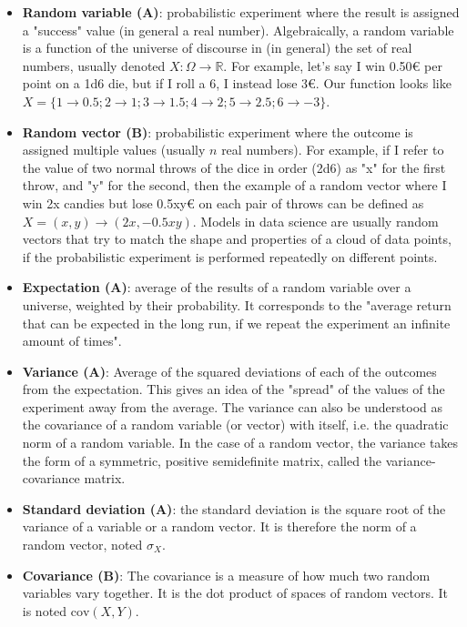\documentclass{article}
\begin{document}
\begin{itemize}
    \item \textbf{Random variable (A)}: probabilistic experiment where the result is assigned a "success" value (in general a real number). Algebraically, a random variable is a function of the universe of discourse in (in general) the set of real numbers, usually denoted $X : \Omega \rightarrow \mathbb{R}$. For example, let's say I win 0.50€ per point on a 1d6 die, but if I roll a 6, I instead lose 3€. Our function looks like $X = \{ 1 \rightarrow 0.5 ; 2 \rightarrow 1 ; 3 \rightarrow 1.5 ; 4 \rightarrow 2 ; 5 \rightarrow 2.5 ; 6 \rightarrow -3 \}$.
    
    \item \textbf{Random vector (B)}: probabilistic experiment where the outcome is assigned multiple values (usually $n$ real numbers). For example, if I refer to the value of two normal throws of the dice in order (2d6) as "x" for the first throw, and "y" for the second, then the example of a random vector where I win 2x candies but lose 0.5xy€ on each pair of throws can be defined as $X = (x, y) \rightarrow (2x, -0.5xy)$. Models in data science are usually random vectors that try to match the shape and properties of a cloud of data points, if the probabilistic experiment is performed repeatedly on different points.
    
    \item \textbf{Expectation (A)}: average of the results of a random variable over a universe, weighted by their probability. It corresponds to the "average return that can be expected in the long run, if we repeat the experiment an infinite amount of times".
    
    \item \textbf{Variance (A)}: Average of the squared deviations of each of the outcomes from the expectation. This gives an idea of the "spread" of the values of the experiment away from the average. The variance can also be understood as the covariance of a random variable (or vector) with itself, i.e. the quadratic norm of a random variable. In the case of a random vector, the variance takes the form of a symmetric, positive semidefinite matrix, called the variance-covariance matrix.
    
    \item \textbf{Standard deviation (A)}: the standard deviation is the square root of the variance of a variable or a random vector. It is therefore the norm of a random vector, noted $\sigma_X$.
    
    \item \textbf{Covariance (B)}: The covariance is a measure of how much two random variables vary together. It is the dot product of spaces of random vectors. It is noted $\text{cov}(X, Y)$.
    

\end{itemize}
\end{document}
